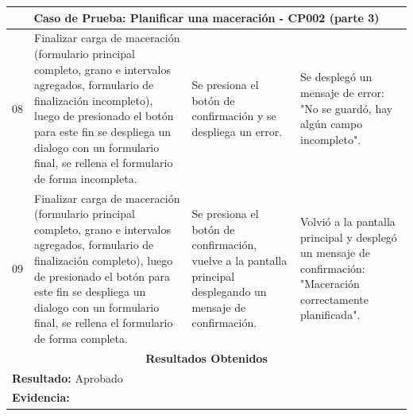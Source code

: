         \begin{minipage}{0.95\textwidth}
        \begin{center}
        \begin{tabularx}{\textwidth}{ | p{2cm} | X | X | X |}
        \hline
        \multicolumn{4}{|c|}{\textbf{Caso de Prueba: Planificar una maceración - CP002 (parte 3)}} \\
        \hline
        08 & Finalizar carga de maceración (formulario principal completo, grano e intervalos agregados, formulario de finalización incompleto), luego de presionado el botón para este fin se despliega un dialogo con un formulario final, se rellena el formulario de forma incompleta. & Se presiona el botón de confirmación y se despliega un error. & Se desplegó un mensaje de error: "No se guardó, hay algún campo incompleto".\\
        \hline
        09 & Finalizar carga de maceración (formulario principal completo, grano e intervalos agregados, formulario de finalización completo), luego de presionado el botón para este fin se despliega un dialogo con un formulario final, se rellena el formulario de forma completa. & Se presiona el botón de confirmación, vuelve a la pantalla principal desplegando un mensaje de confirmación. & Volvió a la pantalla principal y desplegó un mensaje de confirmación: "Maceración correctamente planificada".\\
        \hline
        \multicolumn{4}{|c|}{\textbf{Resultados Obtenidos}} \\
        \hline
        \multicolumn{4}{|l|}{\textbf{Resultado:} Aprobado} \\
        \hline
        \multicolumn{4}{|l|}{\textbf{Evidencia: }} \\
        \hline
     \end{tabularx}
    \label{CP002-p3}
    \end{center}
    \end{minipage}
    
